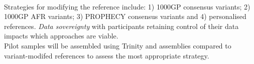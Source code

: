 \documentclass[25pt,margin=20mm,innermargin=-6in,blockverticalspace=1mm]{tikzposter}
\begin{document}
\begin{columns}
{\begin{minipage}{\linewidth}
    \end{minipage}
    ~\\[1cm]
    Strategies for modifying the reference include: 1) 1000GP consensus variants; 2) 1000GP AFR variants; 3) PROPHECY consensus variants and 4) personalised references.
    \textit{Data sovereignty} with participants retaining control of their data impacts which approaches are viable.
    \\
    
    Pilot samples will be assembled using Trinity and assemblies compared to variant-modifed references to assess the most appropriate strategy.
    	
    }

\end{columns}
\end{document}
